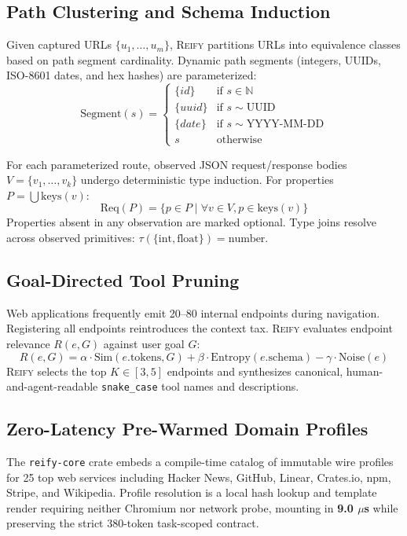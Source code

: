 \documentclass[10pt,twocolumn]{article}
\begin{document}
\subsection{Path Clustering and Schema Induction}
Given captured URLs $\{u_1, \dots, u_m\}$, \textsc{Reify} partitions URLs into equivalence classes based on path segment cardinality. Dynamic path segments (integers, UUIDs, ISO-8601 dates, and hex hashes) are parameterized:
\begin{equation}
    \text{Segment}(s) = \begin{cases}
        \{id\} & \text{if } s \in \mathbb{N} \\
        \{uuid\} & \text{if } s \sim \text{UUID} \\
        \{date\} & \text{if } s \sim \text{YYYY-MM-DD} \\
        s & \text{otherwise}
    \end{cases}
\end{equation}

For each parameterized route, observed JSON request/response bodies $V = \{v_1, \dots, v_k\}$ undergo deterministic type induction. For properties $P = \bigcup \text{keys}(v)$:
\begin{equation}
    \text{Req}(P) = \{p \in P \mid \forall v \in V, p \in \text{keys}(v)\}
\end{equation}
Properties absent in any observation are marked optional. Type joins resolve across observed primitives: $\tau(\{\text{int}, \text{float}\}) = \text{number}$.

\subsection{Goal-Directed Tool Pruning}
Web applications frequently emit 20--80 internal endpoints during navigation. Registering all endpoints reintroduces the context tax. \textsc{Reify} evaluates endpoint relevance $R(e, G)$ against user goal $G$:
\begin{equation}
    R(e, G) = \alpha \cdot \text{Sim}(e.\text{tokens}, G) + \beta \cdot \text{Entropy}(e.\text{schema}) - \gamma \cdot \text{Noise}(e)
\end{equation}
\textsc{Reify} selects the top $K \in [3, 5]$ endpoints and synthesizes canonical, human-and-agent-readable \texttt{snake\_case} tool names and descriptions.

\subsection{Zero-Latency Pre-Warmed Domain Profiles}
The \texttt{reify-core} crate embeds a compile-time catalog of immutable wire profiles for 25 top web services including Hacker News, GitHub, Linear, Crates.io, npm, Stripe, and Wikipedia. Profile resolution is a local hash lookup and template render requiring neither Chromium nor network probe, mounting in \textbf{9.0 $\mu$s} while preserving the strict 380-token task-scoped contract.
\end{document}
